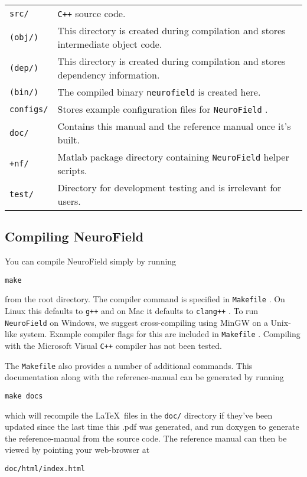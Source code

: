 \documentclass[12pt,a4paper]{article}
\newcommand{\type}[1]{{\small\small\tt #1} }
\newcommand{\NF}[0]{\type{NeuroField}}
\begin{document}
\begin{tabular}{l p{13cm}}
\type{src/}& \type{C++} source code.\\
\type{(obj/)}& This directory is created during compilation and stores intermediate object code.\\
\type{(dep/)}& This directory is created during compilation and stores dependency information.\\
\type{(bin/)}& The compiled binary \type{neurofield} is created here.\\
\type{configs/}& Stores example configuration files for \NF.\\
\type{doc/}& Contains this manual and the reference manual once it's built.\\
\type{+nf/}& Matlab package directory containing \NF helper scripts.\\
\type{test/}& Directory for development testing and is irrelevant for users.\\
\end{tabular}

\subsection{Compiling NeuroField}
\label{sec:compiling}
You can compile NeuroField simply by running

\begin{lstlisting}
make
\end{lstlisting}

from the root directory. The compiler command is specified in \type{Makefile}. On Linux this defaults to \type{g++} and on Mac it defaults to \type{clang++}. To run \NF on Windows, we suggest cross-compiling using MinGW on a Unix-like system. Example compiler flags for this are included in \type{Makefile}. Compiling with the Microsoft Visual \type{C++} compiler has not been tested.

The \type{Makefile} also provides a number of additional commands. This documentation along with the reference-manual can be generated by running
\begin{lstlisting}
make docs
\end{lstlisting}
which will recompile the \LaTeX\ files in the \type{doc/} directory if they've been updated since the last time this .pdf was generated, and run doxygen to generate the reference-manual from the source code. The reference manual can then be viewed by pointing your web-browser at

\begin{lstlisting}
doc/html/index.html
\end{lstlisting}
\end{document}
